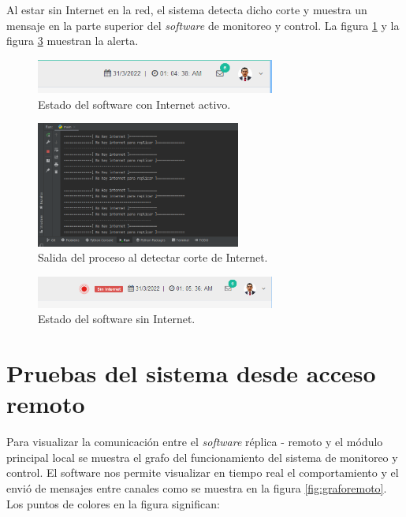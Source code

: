 Al estar sin Internet en la red, el sistema detecta dicho corte y muestra un mensaje en la parte superior del \emph{software} de monitoreo y control. La figura \ref{fig:inter2} y la figura \ref{fig:inter3} muestran la alerta.
\begin{figure}[htpb]
\centering 
\includegraphics[width=0.7\textwidth]{./Figures/test/replicador/desconexion1.png}
\caption{Estado del software con Internet activo.}
\label{fig:inter2}
\end{figure}
\begin{figure}[htpb]
\centering 
\includegraphics[width=0.6\textwidth]{./Figures/test/replicador/desconexion3.png}
\caption{Salida del proceso al detectar corte de Internet.}
\label{fig:inter1}
\end{figure}
\vspace{0.25cm}
\begin{figure}[htpb]
\centering 
\includegraphics[width=0.7\textwidth]{./Figures/test/replicador/desconexion2.png}
\caption{Estado del software sin Internet.}
\label{fig:inter3}
\end{figure}


\section{Pruebas del sistema desde acceso remoto}

Para visualizar la comunicación entre el \emph{software} réplica - remoto y el módulo principal local se muestra el grafo del funcionamiento del sistema de monitoreo y control. El software nos permite visualizar en tiempo real el comportamiento y el envió de mensajes entre canales como se muestra en la figura \ref{fig:graforemoto}. Los puntos de colores en la figura significan:

